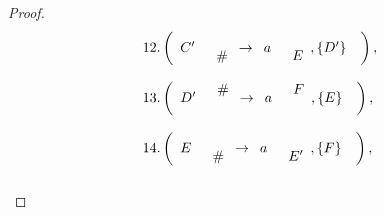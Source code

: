 \documentclass[11pt]{article}
\begin{document}
\begin{proof}
\[\begin{array}{l}
 12.\left( {\begin{array}{*{20}c}
   {C'} & {\begin{array}{*{20}c}
   {}  \\
   \#   \\
\end{array} \to \begin{array}{*{20}c}
   a & {\begin{array}{*{20}c}
   {}  \\
   E  \\
\end{array},\left\{ {D'} \right\}}  \\
\end{array}}  \\
\end{array}} \right), \\\\
13.\left( {\begin{array}{*{20}c}
   {D'} & {\begin{array}{*{20}c}
   \#   \\
   {}  \\
\end{array} \to \begin{array}{*{20}c}
   a & {\begin{array}{*{20}c}
   F  \\
   {}  \\
\end{array},\left\{ E \right\}}  \\
\end{array}}  \\
\end{array}} \right), \\\\
 14.\left( {\begin{array}{*{20}c}
   E & {\begin{array}{*{20}c}
   {}  \\
   \#   \\
\end{array} \to \begin{array}{*{20}c}
   a & {\begin{array}{*{20}c}
   {}  \\
   {E'}  \\
\end{array},\left\{ F \right\}}  \\
\end{array}}  \\
\end{array}} \right), \\\\

\end{array}\]
\end{proof}
\end{document}
